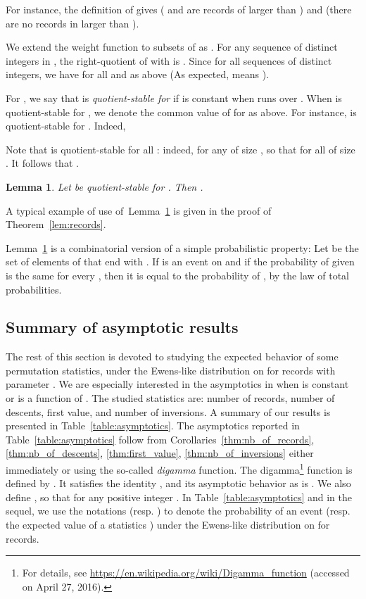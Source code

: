 \documentclass[proceedings]{aofa}
\newtheorem{lemma}[theorem]{Lemma}
\newenvironment{remark}{\noindent{\bf Remark:} }{\hfill}
\begin{document}
For instance, the definition of  gives  ( and  are records of  larger than ) 
and  (there are no records in  larger than ). 

We extend the weight function  to subsets  of  as . 
For any sequence  of  distinct integers in , the right-quotient of  with  is . 
Since  for all sequences  of distinct integers, 
we have  for all  and  as above 
(As expected,  means ).



For , we say that  is \emph{quotient-stable for } if  
 is constant when  runs over . When  is quotient-stable for , we denote  the common value of  for  as above. 
For instance,  is quotient-stable for . Indeed, 



Note that  is quotient-stable for all : 
indeed, for any  of size ,  so that  for all  of size . 
It follows that . 

\begin{lemma}\label{lem:qot}
Let  be quotient-stable for . Then 
.
\end{lemma}

A typical example of use of~Lemma~\ref{lem:qot} is given in the proof of Theorem~\ref{lem:records}.

\begin{remark}
Lemma~\ref{lem:qot} is a combinatorial version of a simple probabilistic property: Let  be the set of elements of  that end with . If  is an event on  and if the probability of  given  is the same for every , then it is equal to the probability of , by the law of total probabilities.
\end{remark}

\subsection{Summary of asymptotic results}

The rest of this section is devoted to studying the expected behavior of some permutation statistics, 
under the Ewens-like distribution on  for records with parameter . 
We are especially interested in the asymptotics in  when  is constant or is a function of . 
The studied statistics are: number of records, number of descents, first value, and number of inversions. 
A summary of our results is presented in Table~\ref{table:asymptotics}. 
The asymptotics reported in Table~\ref{table:asymptotics} follow from Corollaries~\ref{thm:nb_of_records}, \ref{thm:nb_of_descents}, \ref{thm:first_value}, \ref{thm:nb_of_inversions} 
either immediately or using the so-called \emph{digamma} function. 
The digamma\footnote{For details, see \url{https://en.wikipedia.org/wiki/Digamma_function} (accessed on April 27, 2016).} function is defined by . 
It satisfies the identity , 
and its asymptotic behavior as  is . We also define , so that  for any positive integer .
In Table~\ref{table:asymptotics} and in the sequel,
we use the notations  (resp. ) to denote 
the probability of an event  (resp. the expected value of a statistics )   
under the Ewens-like distribution on  for records.
 
\end{document}
